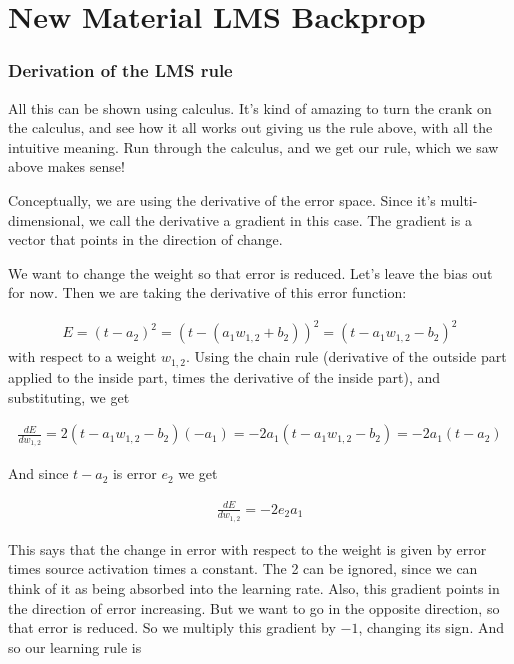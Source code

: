 \chapter{New Material LMS Backprop}

\subsection{Derivation of the LMS rule}

All this can be shown using calculus. It's kind of amazing to turn the crank on the calculus, and see how it all works out giving us the rule above, with all the intuitive meaning. Run through the calculus, and we get our rule, which we saw above makes sense!

Conceptually, we are using the derivative of the error space. Since it's multi-dimensional, we call the derivative a gradient in this case. The gradient is a vector that points in the direction of change. 

We want to change the weight so that error is reduced. Let's leave the bias out for now. Then we are taking the  derivative of this error function:

\begin{eqnarray*}
E = (t - a_2)^2  =  (t - ( a_1 w_{1,2} + b_2))^2  =  (t -  a_1 w_{1,2} -  b_2)^2 
\end{eqnarray*}
with respect to a weight $w_{1,2}$.   Using the chain rule (derivative of the outside part applied to the inside part, times the derivative of the inside part), and substituting, we get

\begin{eqnarray*}
\frac{dE}{dw_{1,2}} = 2 (t - a_1 w_{1,2} - b_2) (-a_1) =  -2 a_1 (t - a_1 w_{1,2} - b_2) =  -2 a_1 (t - a_2)
\end{eqnarray*}

And since $t -  a_2$ is error $e_2$ we get

\begin{eqnarray*}
\frac{dE}{dw_{1,2}} = -2 e_2 a_1
\end{eqnarray*}

This says that the change in error with respect to the weight is given by error times source activation times a constant. The 2 can be ignored, since we can think of it as being absorbed into the learning rate. Also, this gradient points in the direction of error increasing. But we want to go in the opposite direction, so that error is reduced. So we multiply this gradient by $-1$, changing its sign. And so our learning rule is 

